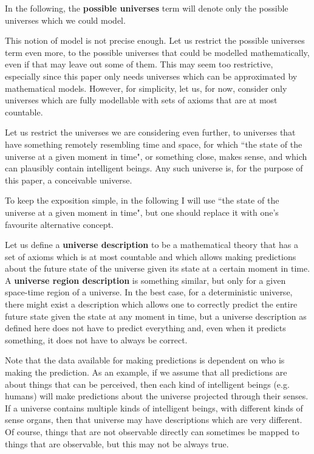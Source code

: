 \documentclass[a4paper
,draft
]{article}
\newcommand{\svn}[2][]{\todo[author=Virgil,color=red!25!white,#1]{#2}}
\newcommand{\definitie}[1]{\textbf{#1}}
\newcommand{\ghilimele}[1]{``#1"}
\begin{document}
In the following, the \definitie{possible universes} term will denote
only the possible universes which we could model.

This notion of model is not precise enough.
Let us restrict the possible universes term even more,
to the possible universes that could be modelled mathematically,
even if that may leave out some of them.
This may seem too restrictive,
especially since this paper only needs universes which can be approximated
by mathematical models.
However, for simplicity, let us, for now, consider only universes
which are fully modellable with sets of axioms that are at most countable.
\svn{Do I need this?}

Let us restrict the universes we are considering even further, to universes that
have something remotely resembling time and space, for which
\ghilimele{the state of the universe at a given moment in time}, or something
close, makes sense, and which can plausibly contain intelligent beings.
Any such universe is, for the purpose of this paper, a conceivable universe.

To keep the exposition simple, in the following I will use
\ghilimele{the state of the universe at a given moment in time},
but one should replace it with one's favourite alternative concept.

Let us define a \definitie{universe description} to be a mathematical
theory that has
a set of axioms which is at most countable and which allows making
predictions about the future state of the universe given its state
at a certain moment in time. A \definitie{universe region description}
is something similar, but only for a given space-time region of a universe.
In the best case, for a deterministic universe, there might exist
a description which allows one to correctly predict the entire future state
given the state at any moment in time, but a universe description
as defined here does not have to predict everything and,
even when it predicts something, it does not have to always be correct.

Note that the data available for making predictions is dependent
on who is making the prediction. As an example, if we assume that
all predictions are about things that can be perceived, then
each kind of intelligent beings (e.g. humans) will make predictions
about the universe projected through their senses. If a universe contains
multiple kinds of intelligent beings, with different kinds of
sense organs, then that universe may have descriptions which are
very different.
Of course, things that are not observable directly can sometimes be mapped
to things that are observable, but this may not be always true.
\end{document}
